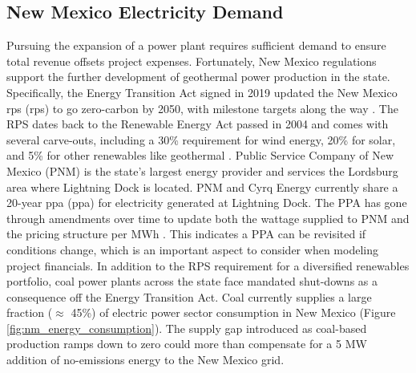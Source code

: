\subsection{New Mexico Electricity Demand}
Pursuing the expansion of a power plant requires sufficient demand to ensure total revenue offsets project expenses. Fortunately, New Mexico regulations support the further development of geothermal power production in the state. Specifically, the Energy Transition Act signed in 2019 updated the New Mexico \acrlong{rps} (\acrshort{rps}) to go zero-carbon by 2050, with milestone targets along the way \citep{lillian_new_2019}. The RPS dates back to the Renewable Energy Act passed in 2004 and comes with several carve-outs, including a 30\% requirement for wind energy, 20\% for solar, and 5\% for other renewables like geothermal \citep{dsire_dsire_2021}. Public Service Company of New Mexico (PNM) is the state’s largest energy provider and services the Lordsburg area where Lightning Dock is located. PNM and Cyrq Energy currently share a 20-year \acrlong{ppa} (\acrshort{ppa}) for electricity generated at Lightning Dock. The PPA has gone through amendments over time to update both the wattage supplied to PNM and the pricing structure per MWh \citep[e.g.,][]{pnm_pnm_2014,stanfield_new_2017}. This indicates a PPA can be revisited if conditions change, which is an important aspect to consider when modeling project financials. 
In addition to the RPS requirement for a diversified renewables portfolio, coal power plants across the state face mandated shut-downs as a consequence off the Energy Transition Act. Coal currently supplies a large fraction ($\approx$ 45\%) of electric power sector consumption in New Mexico (Figure \ref{fig:nm_energy_consumption}). The supply gap introduced as coal-based production ramps down to zero could more than compensate for a 5 MW addition of no-emissions energy to the New Mexico grid.

